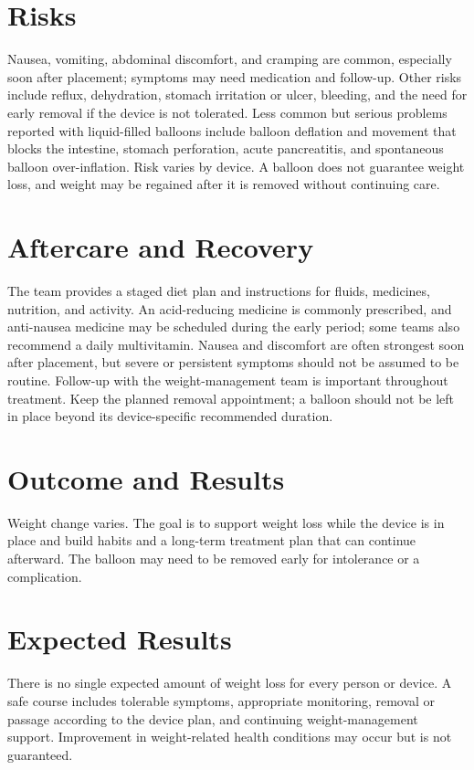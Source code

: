 \section*{Risks}
Nausea, vomiting, abdominal discomfort, and cramping are common, especially soon after placement; symptoms may need medication and follow-up. Other risks include reflux, dehydration, stomach irritation or ulcer, bleeding, and the need for early removal if the device is not tolerated. Less common but serious problems reported with liquid-filled balloons include balloon deflation and movement that blocks the intestine, stomach perforation, acute pancreatitis, and spontaneous balloon over-inflation. Risk varies by device. A balloon does not guarantee weight loss, and weight may be regained after it is removed without continuing care.

\section*{Aftercare and Recovery}
The team provides a staged diet plan and instructions for fluids, medicines, nutrition, and activity. An acid-reducing medicine is commonly prescribed, and anti-nausea medicine may be scheduled during the early period; some teams also recommend a daily multivitamin. Nausea and discomfort are often strongest soon after placement, but severe or persistent symptoms should not be assumed to be routine. Follow-up with the weight-management team is important throughout treatment. Keep the planned removal appointment; a balloon should not be left in place beyond its device-specific recommended duration.

\section*{Outcome and Results}
Weight change varies. The goal is to support weight loss while the device is in place and build habits and a long-term treatment plan that can continue afterward. The balloon may need to be removed early for intolerance or a complication.

\section*{Expected Results}
There is no single expected amount of weight loss for every person or device. A safe course includes tolerable symptoms, appropriate monitoring, removal or passage according to the device plan, and continuing weight-management support. Improvement in weight-related health conditions may occur but is not guaranteed.

